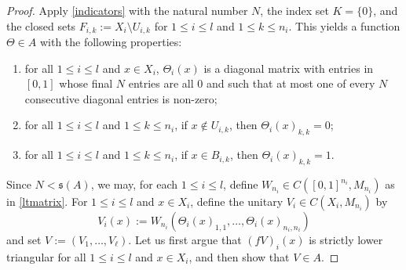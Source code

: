\documentclass[12pt]{amsart}
\numberwithin{equation}{section}
\theoremstyle{definition}
\theoremstyle{remark}
\begin{document}
\begin{proof}
	Apply \autoref{indicators} with the natural number $N$, the index set $K=\{0\}$, and the closed sets $F_{i,k}:=X_{i}\setminus U_{i,k}$ for $1\leq i\leq  l $ and $1\leq k\leq n_{i}$. This yields a function $\Theta\in A$ with the following properties:
	\begin{enumerate}[label=(\Roman*)]
		\item for all $1\leq i\leq  l $ and $x\in X_{i}$, $\Theta_{i}(x)$ is a diagonal matrix with entries in $[0,1]$ whose final $N$ entries are all $0$ and such that at most one of every $N$ consecutive diagonal entries is non-zero;
		\item for all $1\leq i\leq  l $ and $1\leq k\leq n_{i}$, if $x\notin U_{i,k}$, then $\Theta_{i}(x)_{k,k}=0$;
		\item for all $1\leq i\leq  l $ and $1\leq k\leq n_{i}$, if $x\in B_{i,k}$, then $\Theta_{i}(x)_{k,k}=1$. 
	\end{enumerate}
	
	Since $N<\mathfrak{s}(A)$, we may, for each $1\leq i\leq  l $,  define $W_{n_{i}}\in C([0,1]^{n_{i}},M_{n_{i}})$ as in \autoref{ltmatrix}. For $1\leq i\leq l$ and $x\in X_{i}$, define the unitary $V_{i}\in C(X_{i},M_{n_{i}})$ by 
	$$
	V_{i}(x):=W_{n_{i}}(\Theta_{i}(x)_{1,1},\ldots,\Theta_{i}(x)_{n_{i},n_{i}})
	$$
	and set $V:=(V_{1},\ldots,V_{\ell})$. Let us first argue that $(fV)_{i}(x)$ is strictly lower triangular for all $1\leq i\leq  l $ and $x\in X_{i}$, and then show that $V\in A$.
		

\end{proof}
\end{document}
